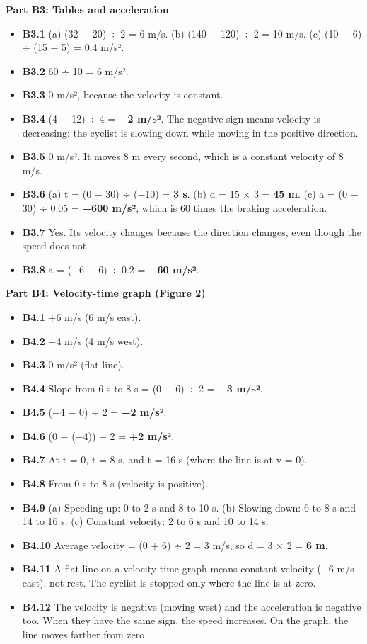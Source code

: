 \documentclass[
]{article}
\providecommand{\tightlist}{%
  \setlength{\itemsep}{0pt}\setlength{\parskip}{0pt}}
\begin{document}
\textbf{Part B3: Tables and acceleration}

\begin{itemize}
\tightlist
\item
  \textbf{B3.1} (a) (32 − 20) ÷ 2 = 6 m/s. (b) (140 − 120) ÷ 2 = 10 m/s.
  (c) (10 − 6) ÷ (15 − 5) = 0.4 m/s².
\item
  \textbf{B3.2} 60 ÷ 10 = 6 m/s².
\item
  \textbf{B3.3} 0 m/s², because the velocity is constant.
\item
  \textbf{B3.4} (4 − 12) ÷ 4 = \textbf{−2 m/s²}. The negative sign means
  velocity is decreasing: the cyclist is slowing down while moving in
  the positive direction.
\item
  \textbf{B3.5} 0 m/s². It moves 8 m every second, which is a constant
  velocity of 8 m/s.
\item
  \textbf{B3.6} (a) t = (0 − 30) ÷ (−10) = \textbf{3 s}. (b) d = 15 × 3
  = \textbf{45 m}. (c) a = (0 − 30) ÷ 0.05 = \textbf{−600 m/s²}, which
  is 60 times the braking acceleration.
\item
  \textbf{B3.7} Yes. Its velocity changes because the direction changes,
  even though the speed does not.
\item
  \textbf{B3.8} a = (−6 − 6) ÷ 0.2 = \textbf{−60 m/s²}.
\end{itemize}

\textbf{Part B4: Velocity-time graph (Figure 2)}

\begin{itemize}
\tightlist
\item
  \textbf{B4.1} +6 m/s (6 m/s east).
\item
  \textbf{B4.2} −4 m/s (4 m/s west).
\item
  \textbf{B4.3} 0 m/s² (flat line).
\item
  \textbf{B4.4} Slope from 6 s to 8 s = (0 − 6) ÷ 2 = \textbf{−3 m/s²}.
\item
  \textbf{B4.5} (−4 − 0) ÷ 2 = \textbf{−2 m/s²}.
\item
  \textbf{B4.6} (0 − (−4)) ÷ 2 = \textbf{+2 m/s²}.
\item
  \textbf{B4.7} At t = 0, t = 8 s, and t = 16 s (where the line is at v
  = 0).
\item
  \textbf{B4.8} From 0 s to 8 s (velocity is positive).
\item
  \textbf{B4.9} (a) Speeding up: 0 to 2 s and 8 to 10 s. (b) Slowing
  down: 6 to 8 s and 14 to 16 s. (c) Constant velocity: 2 to 6 s and 10
  to 14 s.
\item
  \textbf{B4.10} Average velocity = (0 + 6) ÷ 2 = 3 m/s, so d = 3 × 2 =
  \textbf{6 m}.
\item
  \textbf{B4.11} A flat line on a velocity-time graph means constant
  velocity (+6 m/s east), not rest. The cyclist is stopped only where
  the line is at zero.
\item
  \textbf{B4.12} The velocity is negative (moving west) and the
  acceleration is negative too. When they have the same sign, the speed
  increases. On the graph, the line moves farther from zero.
\end{itemize}
\end{document}
